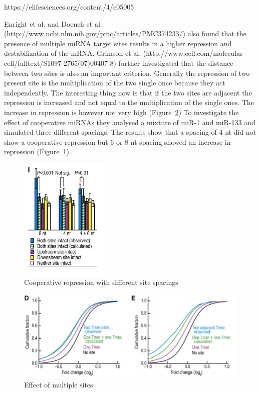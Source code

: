 \documentclass[12pt]{article}
\begin{document}
https://elifesciences.org/content/4/e05005

Enright et al. \cite{Enright} and Doench et al. \cite{Doench} (http://www.ncbi.nlm.nih.gov/pmc/articles/PMC374233/)  also found that the presence of multiple miRNA target sites results in a higher repression and destabilization of the mRNA. Grimson et al. \cite{Grimson} (http://www.cell.com/molecular-cell/fulltext/S1097-2765(07)00407-8) further investigated that the distance between two sites is also an important criterion. Generally the repression of two present site is the multiplication of the two single once because they act independently. The interesting thing now is that if the two sites are adjacent the repression is increased and not equal to the multiplication of the single ones. The increase in repression is however not very high (Figure~\ref{sitedistance}) To investigate the effect of cooperative miRNAs they analysed a mixture of miR-1 and miR-133 and simulated three different spacings. The results show that a spacing of 4 nt did not show a cooperative repression but 6 or 8 nt spacing showed an increase in repression (Figure~\ref{sitespacing}).\\

\begin{figure}
\centering
\includegraphics[scale=1.2]{results/sites_8nt.PNG}  
\caption{Cooperative repression with different site spacings}
\label{sitespacing}
\end{figure}

\begin{figure}
\centering
\includegraphics[scale=0.8]{results/sites_distance.PNG}
\caption{Effect of multiple sites}
\label{sitedistance}
\end{figure}
\end{document}
